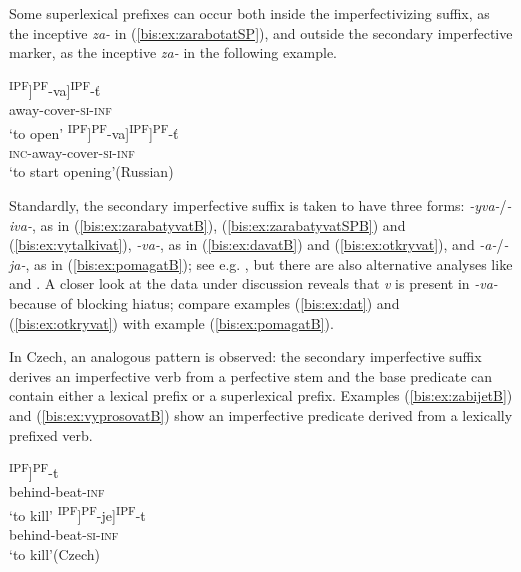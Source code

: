 \documentclass[output=paper]{langscibook}
\begin{document}
\noindent Some superlexical prefixes can occur both inside the imperfectivizing suffix, as the inceptive \textit{za-} in (\ref{bis:ex:zarabotatSP}), and outside the secondary imperfective marker, as the inceptive \textit{za-} in the following example.

\ea\label{bis:ex:otkryvat}
\ea\label{bis:ex:otkryvatA} \gll 
[[ot-[kry]\textsuperscript{IPF}]\textsuperscript{PF}-va]\textsuperscript{IPF}-ť \\
away-cover-\textsc{si}-\textsc{inf} \\
\glt ‘to open’
\ex\label{bis:ex:zaotkryvatB} \gll [za-[[ot-[kry]\textsuperscript{IPF}]\textsuperscript{PF}-va]\textsuperscript{IPF}]\textsuperscript{PF}-ť \\  
\textsc{inc}-away-cover-\textsc{si}-\textsc{inf} \\
\glt ‘to start opening’\hfill (Russian)
\z\z

\noindent Standardly, the secondary imperfective suffix is taken to have three forms: \textit{-yva-}\slash\textit{-iva-}, as in (\ref{bis:ex:zarabatyvatB}), (\ref{bis:ex:zarabatyvatSPB}) and (\ref{bis:ex:vytalkivat}), \textit{-va-}, as in (\ref{bis:ex:davatB}) and (\ref{bis:ex:otkryvat}), and \textit{-a-}/\textit{-ja-}, as in (\ref{bis:ex:pomagatB}); see e.g. \citet{Vinogradov.etal1952}, but there are also alternative analyses like \citet{Isacenko1962} and \citet{Matushansky2009}. A closer look at the data under discussion reveals that \textit{v} is present in \textit{-va-} because of blocking hiatus; compare examples (\ref{bis:ex:dat}) and (\ref{bis:ex:otkryvat}) with example (\ref{bis:ex:pomagatB}). 			

In Czech, an analogous pattern is observed: the secondary imperfective suffix derives an imperfective verb from a perfective stem and the base predicate can contain either a lexical prefix or a superlexical prefix. Examples (\ref{bis:ex:zabijetB}) and (\ref{bis:ex:vyprosovatB}) show an imperfective predicate derived from a lexically prefixed verb. 

\ea\label{bis:ex:zabit}
\ea\label{bis:ex:zabitA} \gll [za-[bí]\textsuperscript{IPF}]\textsuperscript{PF}-t \\ 
behind-beat-\textsc{inf} \\
\glt ‘to kill’
\ex\label{bis:ex:zabijetB} \gll [[za-[bí]\textsuperscript{IPF}]\textsuperscript{PF}-je]\textsuperscript{IPF}-t \\  
behind-beat-\textsc{si}-\textsc{inf} \\
\glt ‘to kill’\hfill (Czech)
\z
\end{document}
